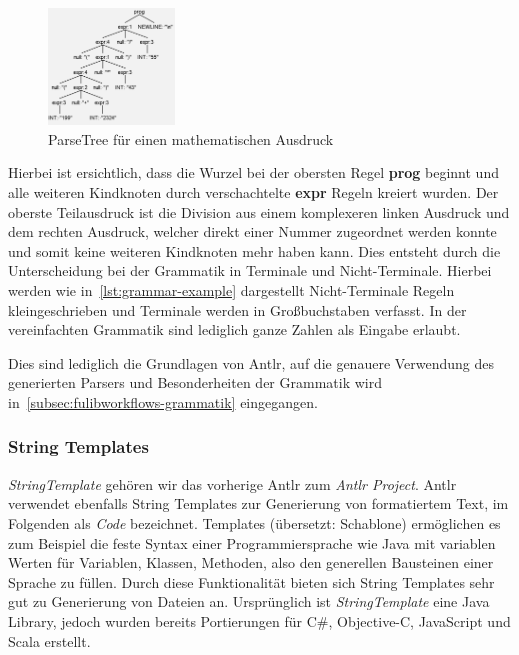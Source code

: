 \begin{figure}[h]
    \centering
    \includegraphics[width=0.3\textwidth]{images/2.2/parseTreeExample}
    \caption{ParseTree für einen mathematischen Ausdruck}
    \label{fig:parse-example}
\end{figure}

Hierbei ist ersichtlich, dass die Wurzel bei der obersten Regel \textbf{prog} beginnt und alle weiteren Kindknoten durch verschachtelte \textbf{expr} Regeln kreiert wurden.
Der oberste Teilausdruck ist die Division aus einem komplexeren linken Ausdruck und dem rechten Ausdruck, welcher direkt einer Nummer zugeordnet werden konnte und somit keine weiteren Kindknoten mehr haben kann.
Dies entsteht durch die Unterscheidung bei der Grammatik in Terminale und Nicht-Terminale.
Hierbei werden wie in~\ref{lst:grammar-example} dargestellt Nicht-Terminale Regeln kleingeschrieben und Terminale werden in Großbuchstaben verfasst.
In der vereinfachten Grammatik sind lediglich ganze Zahlen als Eingabe erlaubt.

Dies sind lediglich die Grundlagen von Antlr, auf die genauere Verwendung des generierten Parsers und Besonderheiten der Grammatik wird in~\ref{subsec:fulibworkflows-grammatik} eingegangen.

\subsubsection{String Templates}
\textit{StringTemplate} gehören wir das vorherige Antlr zum \textit{Antlr Project}.
Antlr verwendet ebenfalls String Templates zur Generierung von formatiertem Text, im Folgenden als \textit{Code} bezeichnet.
Templates (übersetzt: Schablone) ermöglichen es zum Beispiel die feste Syntax einer Programmiersprache wie Java mit variablen Werten für
Variablen, Klassen, Methoden, also den generellen Bausteinen einer Sprache zu füllen.
Durch diese Funktionalität bieten sich String Templates sehr gut zu Generierung von Dateien an.
Ursprünglich ist \textit{StringTemplate} eine Java Library, jedoch wurden bereits Portierungen für C\#, Objective-C, JavaScript und Scala erstellt.

